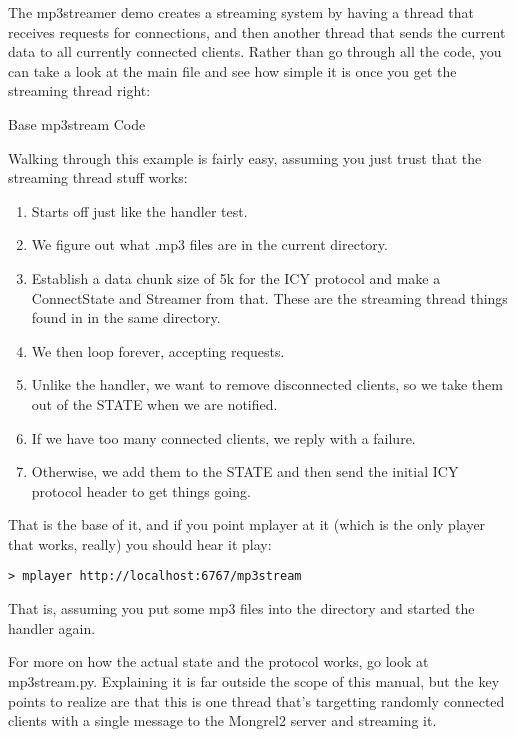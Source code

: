 The mp3streamer demo creates a streaming system by
having a thread that receives requests for connections, and then
another thread that sends the current data to all currently connected
clients.  Rather than go through all the code, you can take a look
at the main file and see how simple it is once you get the
streaming thread right:

\begin{code}{Base mp3stream Code}
  
\end{code}

Walking through this example is fairly easy, assuming you just trust
that the streaming thread stuff works:

\begin{enumerate}
\item Starts off just like the handler test.
\item We figure out what .mp3 files are in the current directory.
\item Establish a data chunk size of 5k for the ICY protocol and
    make a ConnectState and Streamer from that.  These are the
    streaming thread things found in  in the same
    directory.
\item We then loop forever, accepting requests.
\item Unlike the handler, we want to remove disconnected clients,
    so we take them out of the STATE when we are notified.
\item If we have too many connected clients, we reply with a failure.
\item Otherwise, we add them to the STATE and then send the initial
    ICY protocol header to get things going.
\end{enumerate}


That is the base of it, and if you point mplayer at it (which is
the only player that works, really) you should hear it play:

\begin{lstlisting}
> mplayer http://localhost:6767/mp3stream
\end{lstlisting}

That is, assuming you put some mp3 files into the directory and
started the handler again.

For more on how the actual state and the protocol works, go look
at mp3stream.py.  Explaining it is far outside the scope of this manual,
but the key points to realize are that this is one thread that's
targetting randomly connected clients with a single message to the
Mongrel2 server and streaming it.


